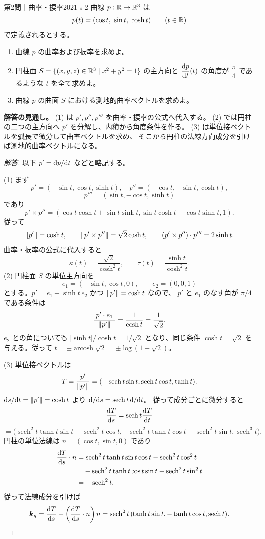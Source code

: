 \begin{problem}{第2問｜曲率・捩率}{2021-s-2}
曲線 $p:\mathbb{R}\to\mathbb{R}^3$ は
\[
p(t)=(\cos t,\ \sin t,\ \cosh t)\qquad(t\in\mathbb{R})
\]
で定義されるとする。
\begin{enumerate}
  \item[(1)] 曲線 $p$ の曲率および捩率を求めよ。
  \item[(2)] 円柱面 $S=\{(x,y,z)\in\mathbb{R}^3\mid x^2+y^2=1\}$ の主方向と $\dfrac{\mathrm{d} p}{\mathrm{d} t}(t)$ の角度が $\dfrac\pi4$ であるような $t$ を全て求めよ。
  \item[(3)] 曲線 $p$ の曲面 $S$ における測地的曲率ベクトルを求めよ。
\end{enumerate}
\end{problem}
\begin{memo*}
\textbf{解答の見通し。}
(1) は $p',p'',p'''$ を曲率・捩率の公式へ代入する。
(2) では円柱の二つの主方向へ $p'$ を分解し、内積から角度条件を作る。
(3) は単位接ベクトルを弧長で微分して曲率ベクトルを求め、
そこから円柱の法線方向成分を引けば測地的曲率ベクトルになる。
\end{memo*}
\begin{proof}[解答]
以下 $p'=\mathrm{d} p/\mathrm{d} t$ などと略記する。

(1) まず
\[
p'=(-\sin t,\cos t,\sinh t),\quad
p''=(-\cos t,-\sin t,\cosh t),
\]
\[
p'''=(\sin t,-\cos t,\sinh t)
\]
であり
\[
p'\times p''=(\cos t\cosh t+\sin t\sinh t,
\sin t\cosh t-\cos t\sinh t,1).
\]
従って
\[
\lVert p' \rVert=\cosh t,\qquad
\lVert p'\times p'' \rVert=\sqrt2\cosh t,\qquad
(p'\times p'')\cdot p'''=2\sinh t.
\]
曲率・捩率の公式に代入すると
\[
\kappa(t)=\frac{\sqrt2}{\cosh^2t},\qquad
\tau(t)=\frac{\sinh t}{\cosh^2t}.
\]
(2) 円柱面 $S$ の単位主方向を
\[
e_1=(-\sin t,\cos t,0),\qquad e_2=(0,0,1)
\]
とする。$p'=e_1+\sinh t\,e_2$ かつ $\lVert p' \rVert=\cosh t$ なので、
$p'$ と $e_1$ のなす角が $\pi/4$ である条件は
\[
\frac{|p'\cdot e_1|}{\lVert p' \rVert}=\frac1{\cosh t}=\frac1{\sqrt2}.
\]
$e_2$ との角についても $|\sinh t|/\cosh t=1/\sqrt2$ となり、同じ条件
$\cosh t=\sqrt2$ を与える。従って
$t=\pm\operatorname{arcosh}\sqrt2=\pm\log(1+\sqrt2)$。

(3) 単位接ベクトルは
\[
T=\frac{p'}{\lVert p' \rVert}
=(-\operatorname{sech}t\sin t,
  \operatorname{sech}t\cos t,\tanh t).
\]
$\mathrm{d} s/\mathrm{d} t=\lVert p' \rVert=\cosh t$ より $\mathrm{d}/\mathrm{d} s=\operatorname{sech}t\,\mathrm{d}/\mathrm{d} t$。
従って成分ごとに微分すると
\[
\frac{\mathrm{d} T}{\mathrm{d} s}
=\operatorname{sech}t\frac{\mathrm{d} T}{\mathrm{d} t}
\]
\[
=\bigl(
\operatorname{sech}^2t\tanh t\sin t-\operatorname{sech}^2t\cos t,
-\operatorname{sech}^2t\tanh t\cos t-\operatorname{sech}^2t\sin t,
\operatorname{sech}^3t
\bigr).
\]
円柱の単位法線は $n=(\cos t,\sin t,0)$ であり
\begin{align*}
\frac{\mathrm{d} T}{\mathrm{d} s}\cdot n
&=\operatorname{sech}^2t\tanh t\sin t\cos t
-\operatorname{sech}^2t\cos^2t\\
&\quad-\operatorname{sech}^2t\tanh t\cos t\sin t
-\operatorname{sech}^2t\sin^2t\\
&=-\operatorname{sech}^2t.
\end{align*}
従って法線成分を引けば
\[
\boldsymbol{k}_g
=\frac{\mathrm{d} T}{\mathrm{d} s}
-\left(\frac{\mathrm{d} T}{\mathrm{d} s}\cdot n\right)n
=\operatorname{sech}^2t\,
(\tanh t\sin t,-\tanh t\cos t,\operatorname{sech}t).
\]
\end{proof}

